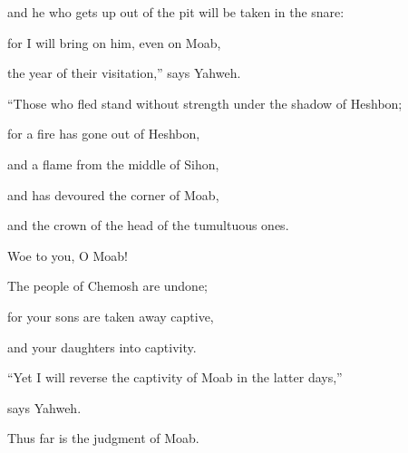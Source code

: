 {\par }{\QB and he who gets up out of the pit will be taken in the snare:
\par }{\Q for I will bring on him, even on Moab,
\par }{\QB the year of their visitation,” says Yahweh.
\par }{\BB \par }{\Q {}“Those who fled stand without strength under the shadow of Heshbon;
\par }{\QB for a fire has gone out of Heshbon,
\par }{\QB and a flame from the middle of Sihon,
\par }{\Q and has devoured the corner of Moab,
\par }{\QB and the crown of the head of the tumultuous ones.
\par }{\Q {}Woe to you, O Moab!
\par }{\QB The people of Chemosh are undone;
\par }{\Q for your sons are taken away captive,
\par }{\QB and your daughters into captivity.
\par }{\BB \par }{\Q {}“Yet I will reverse the captivity of Moab in the latter days,”
\par }{\QB says Yahweh.
\par }{\PP Thus far is the judgment of Moab.

}
